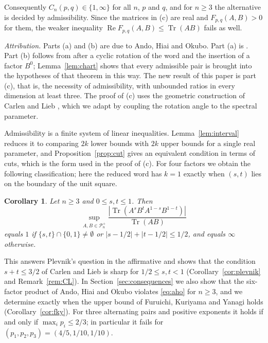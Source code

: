 \documentclass{amsart}
\newtheorem{corollary}[theorem]{Corollary}
\theoremstyle{definition}
\theoremstyle{remark}
\numberwithin{equation}{section}
\newcommand{\Tr}{\operatorname{Tr}}
\newcommand{\PD}{\mathcal{P}_n^{+}}
\begin{document}
Consequently $C_n(p,q)\in\{1,\infty\}$ for all $n$, $p$ and $q$, and for $n\ge 3$ the alternative is decided by admissibility. Since the matrices in (c) are real and $F_{p,q}(A,B)>0$ for them, the weaker inequality $\operatorname{Re}F_{p,q}(A,B)\le\Tr(AB)$ fails as well.

\emph{Attribution.} Parts (a) and (b) are due to Ando, Hiai and Okubo. Part (a) is \cite[Corollary~4.4(i)]{AHO}. Part (b) follows from \cite[Theorem~2.1]{AHO} after a cyclic rotation of the word and the insertion of a factor $B^0$; Lemma~\ref{lem:chart} shows that every admissible pair is brought into the hypotheses of that theorem in this way. The new result of this paper is part (c), that is, the necessity of admissibility, with unbounded ratios in every dimension at least three. The proof of (c) uses the geometric construction of Carlen and Lieb \cite[Section~IV]{CL}, which we adapt by coupling the rotation angle to the spectral parameter.

Admissibility is a finite system of linear inequalities. Lemma~\ref{lem:interval} reduces it to comparing $2k$ lower bounds with $2k$ upper bounds for a single real parameter, and Proposition~\ref{prop:cut} gives an equivalent condition in terms of cuts, which is the form used in the proof of (c). For four factors we obtain the following classification; here the reduced word has $k=1$ exactly when $(s,t)$ lies on the boundary of the unit square.

\begin{corollary}\label{cor:four}
Let $n\ge 3$ and $0\le s,t\le 1$. Then
\[
\sup_{A,B\in\PD}\frac{|\Tr(A^sB^tA^{1-s}B^{1-t})|}{\Tr(AB)}
\]
equals $1$ if $\{s,t\}\cap\{0,1\}\ne\emptyset$ or $|s-1/2|+|t-1/2|\le 1/2$, and equals $\infty$ otherwise.
\end{corollary}

This answers Plevnik's question in the affirmative and shows that the condition $s+t\le 3/2$ of Carlen and Lieb is sharp for $1/2\le s,t<1$ (Corollary~\ref{cor:plevnik} and Remark~\ref{rem:CL}). In Section~\ref{sec:consequences} we also show that the six-factor product of Ando, Hiai and Okubo violates \eqref{eq:aho} for $n\ge 3$, and we determine exactly when the upper bound of Furuichi, Kuriyama and Yanagi holds (Corollary~\ref{cor:fky}). For three alternating pairs and positive exponents it holds if and only if $\max_ip_i\le 2/3$; in particular it fails for $(p_1,p_2,p_3)=(4/5,1/10,1/10)$.
\end{document}
